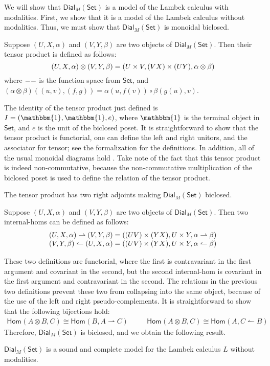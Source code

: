 \documentclass{llncs}
\let\to\relax                   %
\newcommand{\to}{\rightarrow}
\newcommand{\rto}{\leftharpoonup}
\newcommand{\lto}{\rightharpoonup}
\newcommand{\Set}{\mathsf{Set}}
\newcommand{\Dial}[2]{\mathsf{Dial}_{#1}(#2)}
\newcommand{\Hom}[3]{\mathsf{Hom}_{#1}(#2,#3)}
\begin{document}
We will show that $\Dial{M}{\Set}$ is a model of the Lambek calculus with
modalities.  First, we show that it is a model of the Lambek calculus
without modalities.  Thus, we must show that $\Dial{M}{\Set}$ is
monoidal biclosed.

\begin{definition}
  \label{def:dial-monoidal-structure}
  Suppose $(U, X, \alpha)$ and $(V, Y, \beta)$ are two objects of
  $\Dial{M}{\Set}$. Then their tensor product is defined as follows:
  \[
  (U, X, \alpha) \otimes (V, Y, \beta) = (U \times V, (V \to X) \times (U \to Y), \alpha \otimes \beta)
  \]
  where $- \to -$ is the function space from $\Set$, and $(\alpha
  \otimes \beta)((u, v), (f, g)) = \alpha(u, f(v)) \circ \beta(g(u), v)$.
\end{definition}

\noindent
The identity of the tensor product just defined is $I = (\mathbbm{1},
\mathbbm{1}, e)$, where $\mathbbm{1}$ is the terminal object in
$\Set$, and $e$ is the unit of the biclosed poset.  It is
straightforward to show that the tensor product is functorial, one can
define the left and right unitors, and the associator for tensor; see
the formalization for the definitions.  In addition, all of the usual
monoidal diagrams hold \cite{depaiva1990}.  Take note of the fact that
this tensor product is indeed non-commutative, because the
non-commutative multiplication of the biclosed poset is used to define
the relation of the tensor product.

The tensor product has two right adjoints making $\Dial{M}{\Set}$
biclosed.
\begin{definition}
  \label{def:dial-is-biclosed}
  Suppose $(U, X, \alpha)$ and $(V, Y, \beta)$ are two objects of
  $\Dial{M}{\Set}$. Then two internal-homs can be defined as follows:
  \[
  \begin{array}{lll}
    (U, X, \alpha) \lto (V, Y, \beta) = ((U \to V) \times (Y \to X), U \times Y, \alpha \lto \beta)\\
    (V, Y, \beta) \rto (U, X, \alpha) = ((U \to V) \times (Y \to X), U \times Y, \alpha \rto \beta)\\
  \end{array}
  \]
\end{definition}
These two definitions are functorial, where the first is contravariant
in the first argument and covariant in the second, but the second
internal-hom is covariant in the first argument and contravariant in
the second.  The relations in the previous two definitions prevent
these two from collapsing into the same object, because of the use of
the left and right pseudo-complements. It is straightforward to show
that the following bijections hold:
\[
\begin{array}{lll}
  \Hom{}{A \otimes B}{C} \cong \Hom{}{B}{A \lto C} & \quad &  \Hom{}{A \otimes B}{C} \cong \Hom{}{A}{C \rto B}
\end{array}
\]
Therefore, $\Dial{M}{\Set}$ is biclosed, and we obtain the following
result.
\begin{theorem}
  \label{thm:sound-lambek}
  $\Dial{M}{\Set}$ is a sound and complete model for the Lambek
  calculus $L$ without modalities.
\end{theorem}
\vspace{-15px}
\end{document}
